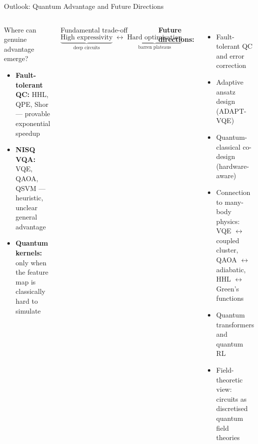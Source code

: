 \documentclass[aspectratio=169,10pt]{beamer}
\begin{document}
\begin{frame}{Outlook: Quantum Advantage and Future Directions}
  \begin{columns}[T]
      \begin{block}{Where can genuine advantage emerge?}
        \begin{itemize}
          \item \textbf{Fault-tolerant QC:} HHL, QPE, Shor —
                provable exponential speedup
          \item \textbf{NISQ VQA:} VQE, QAOA, QSVM —
                heuristic, unclear general advantage
          \item \textbf{Quantum kernels:} only when the feature map
                is classically hard to simulate
        \end{itemize}
      \end{block}
      \vspace{0.3cm}
      \begin{alertblock}{Fundamental trade-off}
        \[
          \underbrace{\text{High expressivity}}_{\text{deep circuits}}
          \;\longleftrightarrow\;
          \underbrace{\text{Hard optimisation}}_{\text{barren plateaus}}
        \]
      \end{alertblock}
      \textbf{Future directions:}
      \begin{itemize}
        \item Fault-tolerant QC and error correction
        \item Adaptive ansatz design (ADAPT-VQE)
        \item Quantum-classical co-design (hardware-aware)
        \item Connection to many-body physics:
              VQE $\leftrightarrow$ coupled cluster,
              QAOA $\leftrightarrow$ adiabatic,
              HHL $\leftrightarrow$ Green's functions
        \item Quantum transformers and quantum RL
        \item Field-theoretic view: circuits as discretised
              quantum field theories
      \end{itemize}
  \end{columns}
\end{frame}
\end{document}
